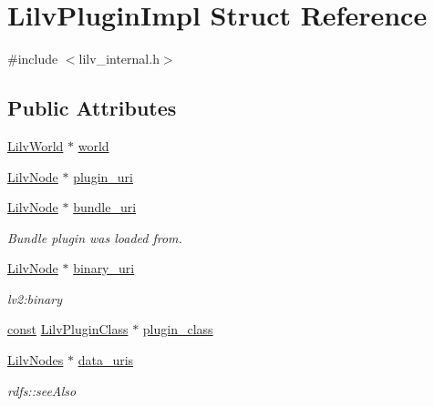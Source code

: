 \hypertarget{struct_lilv_plugin_impl}{}\section{Lilv\+Plugin\+Impl Struct Reference}
\label{struct_lilv_plugin_impl}


{\ttfamily \#include $<$lilv\+\_\+internal.\+h$>$}

\subsection*{Public Attributes}
\begin{DoxyCompactItemize}
\item 
\hyperlink{lilv_8h_a91c1745aa6ffca2b6b87c56df6c5ab86}{Lilv\+World} $\ast$ \hyperlink{struct_lilv_plugin_impl_ae4ce79504dd83ecc9919c54cfab37ace}{world}
\item 
\hyperlink{lilv_8h_ae183dca3dca5368d34dbd863a405437b}{Lilv\+Node} $\ast$ \hyperlink{struct_lilv_plugin_impl_ab292523dd2e272ac3bedee38d750c955}{plugin\+\_\+uri}
\item 
\hyperlink{lilv_8h_ae183dca3dca5368d34dbd863a405437b}{Lilv\+Node} $\ast$ \hyperlink{struct_lilv_plugin_impl_af4f6c03ce7414bd8697e4f2291f15c37}{bundle\+\_\+uri}
\begin{DoxyCompactList}\small\item\em Bundle plugin was loaded from. \end{DoxyCompactList}\item 
\hyperlink{lilv_8h_ae183dca3dca5368d34dbd863a405437b}{Lilv\+Node} $\ast$ \hyperlink{struct_lilv_plugin_impl_a0fb4f626dd8a102784b312cf5f5acbb4}{binary\+\_\+uri}
\begin{DoxyCompactList}\small\item\em lv2\+:binary \end{DoxyCompactList}\item 
\hyperlink{getopt1_8c_a2c212835823e3c54a8ab6d95c652660e}{const} \hyperlink{lilv_8h_a94da06d43a4f980af280b9d8bf4ae1f0}{Lilv\+Plugin\+Class} $\ast$ \hyperlink{struct_lilv_plugin_impl_a5bbafc02157de0f52dcd7bb92a23a547}{plugin\+\_\+class}
\item 
\hyperlink{lilv_8h_a256c2c4443307f320de24bb31198df83}{Lilv\+Nodes} $\ast$ \hyperlink{struct_lilv_plugin_impl_aa551d1d561ff02752bcc09f8b788a8d4}{data\+\_\+uris}
\begin{DoxyCompactList}\small\item\em rdfs\+::see\+Also \end{DoxyCompactList}\item 

\end{DoxyCompactItemize}
